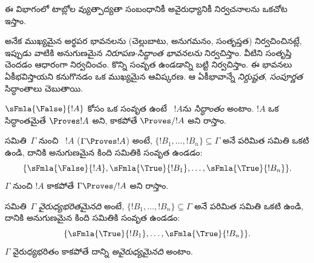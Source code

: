 \documentclass[../../../include/open-logic-section]{subfiles}
\begin{document}
      {}
      {}


\begin{editorial}
ఈ విభాగంలో టాబ్లోల వ్యుత్పాద్యతా సంబంధానికీ అవైరుధ్యానికీ
నిర్వచనాలను ఒకచోట ఇస్తాం.
\end{editorial}

\begin{explain}
అనేక ముఖ్యమైన అర్థపర భావనలను (చెల్లుబాటు, అనుగమనం, సంతృప్తత)
నిర్వచించినట్లే, ఇప్పుడు వాటికి అనుగుణమైన \emph{నిరూపణ-సిద్ధాంత
భావనలను} నిర్వచిస్తాం. వీటిని  
సంతృప్తి చెందడం ఆధారంగా నిర్వచించం. కొన్ని సంవృత
 ఉండడాన్ని బట్టి నిర్వచిస్తాం. ఈ భావనలు ఏకీభవిస్తాయని
కనుగొనడం ఒక ముఖ్యమైన ఆవిష్కరణ. ఆ ఏకీభావాన్నే \emph{నిర్దుష్టత},
\emph{సంపూర్ణత} సిద్ధాంతాలు చెబుతాయి.
\end{explain}


\begin{defn}[సిద్ధాంతాలు]
$\sFmla{\False}{!A}$ కోసం ఒక సంవృత  ఉంటే
~$!A$ను \emph{సిద్ధాంతం} అంటాం. $!A$ ఒక సిద్ధాంతమైతే
$\Proves !A$ అని, కాకపోతే $\Proves/ !A$ అని రాస్తాం.
\end{defn}

\begin{defn}
 సమితి~$\Gamma$ నుంచి ~$!A$
\emph{} ($\Gamma \Proves !A$) అంటే,
$\{!B_1, \dots, !B_n\} \subseteq \Gamma$ అనే పరిమిత సమితి ఒకటి ఉండి,
దానికి అనుగుణమైన కింది సమితికి సంవృత  ఉండడం:
\[
\{
  \sFmla{\False}{!A},
  \sFmla{\True}{!B_1}, \dots,
  \sFmla{\True}{!B_n}
  \}.
\]
$\Gamma$ నుంచి $!A$  కాకపోతే $\Gamma \Proves/ !A$
అని రాస్తాం.
\end{defn}

\begin{defn}[అవైరుధ్యం]
 సమితి~$\Gamma$ \emph{వైరుధ్యభరితమైనది} అంటే,
$\{!B_1, \dots, !B_n\} \subseteq \Gamma$ అనే పరిమిత సమితి ఒకటి ఉండి,
దానికి అనుగుణమైన కింది సమితికి సంవృత  ఉండడం:
\[
\{
  \sFmla{\True}{!B_1}, \dots,
  \sFmla{\True}{!B_n}
  \}.
\]
$\Gamma$ వైరుధ్యభరితం కాకపోతే దాన్ని \emph{అవైరుధ్యమైనది} అంటాం.
\end{defn}
\end{document}
